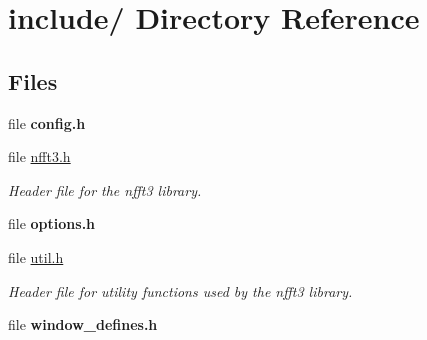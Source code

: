 \hypertarget{dir_000005}{
\section{include/ Directory Reference}
\label{dir_000005}
}
\subsection*{Files}
\begin{CompactItemize}
\item 
file {\bf config.h}
\item 
file \hyperlink{nfft3_8h}{nfft3.h}
\begin{CompactList}\small\item\em Header file for the nfft3 library. \item\end{CompactList}

\item 
file {\bf options.h}
\item 
file \hyperlink{util_8h}{util.h}
\begin{CompactList}\small\item\em Header file for utility functions used by the nfft3 library. \item\end{CompactList}

\item 
file {\bf window\_\-defines.h}
\end{CompactItemize}
